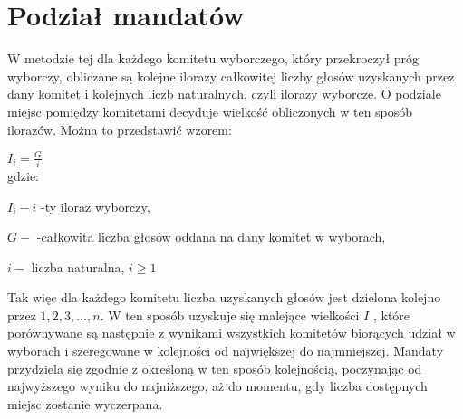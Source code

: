 \documentclass[12pt,a4paper,titlepage]{report}
\begin{document}
\section{Podział mandatów}
W metodzie tej dla każdego komitetu wyborczego, który przekroczył próg wyborczy, obliczane są kolejne ilorazy całkowitej liczby głosów uzyskanych przez dany komitet i kolejnych liczb naturalnych, czyli ilorazy wyborcze. O podziale miejsc pomiędzy komitetami decyduje wielkość obliczonych w ten sposób ilorazów. Można to przedstawić wzorem:

\begin{math}
I_i=\frac{G}{i}
\end{math} \\
gdzie:

\begin{math}
I_i-i
\end{math}
-ty iloraz wyborczy,

\begin{math}
G-
\end{math}
-całkowita liczba głosów oddana na dany komitet w wyborach,

\begin{math}
i-
\end{math}
liczba naturalna,
\begin{math}
i\geq{1}
\end{math}

Tak więc dla każdego komitetu liczba uzyskanych głosów jest dzielona kolejno przez 
\begin{math} 1,2,3,\dots ,n\end{math}. W ten sposób uzyskuje się malejące wielkości 
\begin{math}
I
\end{math}
, które porównywane są następnie z wynikami wszystkich komitetów biorących udział w wyborach i szeregowane w kolejności od największej do najmniejszej. Mandaty przydziela się zgodnie z określoną w ten sposób kolejnością, poczynając od najwyższego wyniku do najniższego, aż do momentu, gdy liczba dostępnych miejsc zostanie wyczerpana.
\newpage
\end{document}
